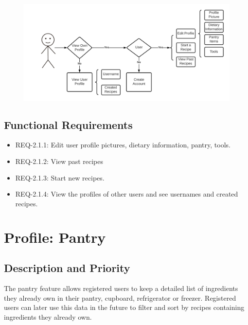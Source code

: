 \documentclass{scrreprt}
\begin{document}
\begin{figure}[H]\centering
    \includegraphics[width=\columnwidth]{FlowCharts/Profile-Profile.png}
\end{figure}

\subsection{Functional Requirements}

\begin{itemize}
    \item REQ-2.1.1: Edit user profile pictures, dietary information, pantry, tools.
    \item REQ-2.1.2: View past recipes
    \item REQ-2.1.3: Start new recipes.
    \item REQ-2.1.4: View the profiles of other users and see usernames and created recipes.
\end{itemize}

\section{Profile: Pantry}

\subsection{Description and Priority}

The pantry feature allows registered users to keep a detailed list of ingredients they already own in their pantry, cupboard, refrigerator or freezer. Registered users can later use this data in the future to filter and sort by recipes containing ingredients they already own.
\end{document}
